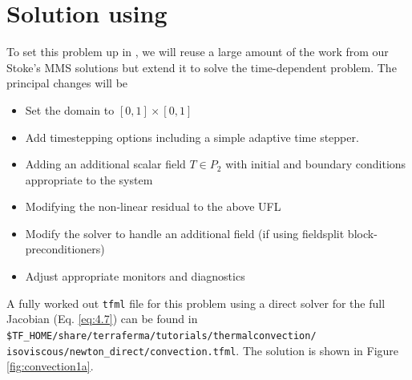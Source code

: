 \section{Solution using \TF}

To set this problem up in \TF{}, we will reuse a large amount of the
work from our Stoke's MMS solutions but extend it to solve the
time-dependent problem.  The principal changes will be
\begin{itemize}
\setlength{\itemsep}{-.1em}
\item Set the domain to  $[0,1]\times[0,1]$ 
\item Add timestepping options including a simple adaptive time stepper.
\item Adding an additional scalar field $T\in P_{2}$ with initial and
  boundary conditions appropriate  to the system
\item Modifying the non-linear residual to the above UFL
\item Modify the solver to handle an additional field (if using
  fieldsplit block-preconditioners)
\item Adjust appropriate monitors and diagnostics
\end{itemize}

A fully worked out \texttt{tfml} file for this problem using a direct
solver for the full Jacobian (Eq. \ref{eq:4.7}) %
can be found in
\texttt{\$TF\_HOME/share/terraferma/tutorials/thermalconvection/ isoviscous/newton\_direct/convection.tfml}.  The
solution is shown in Figure \ref{fig:convection1a}.   





